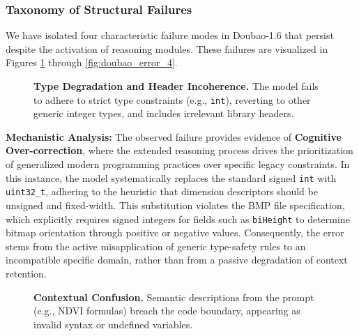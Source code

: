 \documentclass{article}
\theoremstyle{plain}
\theoremstyle{definition}
\theoremstyle{remark}
\begin{document}
\subsubsection{Taxonomy of Structural Failures}

We have isolated four characteristic failure modes in Doubao-1.6 that persist despite the activation of reasoning modules. These failures are visualized in Figures \ref{fig:doubao_error_1} through \ref{fig:doubao_error_4}.

\begin{figure}[H]
    \centering
    \caption{\textbf{Type Degradation and Header Incoherence.} The model fails to adhere to strict type constraints (e.g., \texttt{int}), reverting to other generic integer types, and includes irrelevant library headers.}
    \label{fig:doubao_error_1}
\end{figure}

\noindent \textbf{Mechanistic Analysis:} The observed failure provides evidence of \textbf{Cognitive Over-correction}, where the extended reasoning process drives the prioritization of generalized modern programming practices over specific legacy constraints. In this instance, the model systematically replaces the standard signed \texttt{int} with \texttt{uint32\_t}, adhering to the heuristic that dimension descriptors should be unsigned and fixed-width. This substitution violates the BMP file specification, which explicitly requires signed integers for fields such as \texttt{biHeight} to determine bitmap orientation through positive or negative values. Consequently, the error stems from the active misapplication of generic type-safety rules to an incompatible specific domain, rather than from a passive degradation of context retention.

\begin{figure}[H]
    \centering
    \caption{\textbf{Contextual Confusion.} Semantic descriptions from the prompt (e.g., NDVI formulas) breach the code boundary, appearing as invalid syntax or undefined variables.}
    \label{fig:doubao_error_2}
\end{figure}
\end{document}

